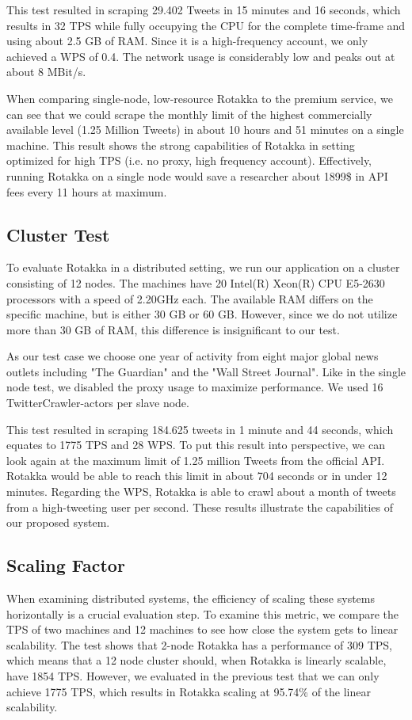 \documentclass{sigchi}
\begin{document}
This test resulted in scraping 29.402 Tweets in 15 minutes and 16 seconds, which results in 32 TPS while fully occupying the CPU for the complete time-frame and using about 2.5 GB of RAM. Since it is a high-frequency account, we only achieved a WPS of 0.4. The network usage is considerably low and peaks out at about 8 MBit/s.

When comparing single-node, low-resource Rotakka to the premium service, we can see that we could scrape the monthly limit of the highest commercially available level (1.25 Million Tweets) in about 10 hours and 51 minutes on a single machine. This result shows the strong capabilities of Rotakka in setting optimized for high TPS (i.e. no proxy, high frequency account). Effectively, running Rotakka on a single node would save a researcher about 1899\$ in API fees every 11 hours at maximum.


\subsection{Cluster Test}
To evaluate Rotakka in a distributed setting, we run our application on a cluster consisting of 12 nodes. The machines have 20 Intel(R) Xeon(R) CPU E5-2630 processors with a speed of 2.20GHz each. The available RAM differs on the specific machine, but is either 30 GB or 60 GB. However, since we do not utilize more than 30 GB of RAM, this difference is insignificant to our test. 

As our test case we choose one year of activity from eight major global news outlets including "The Guardian" and the "Wall Street Journal". Like in the single node test, we disabled the proxy usage to maximize performance. We used 16 TwitterCrawler-actors per slave node.

This test resulted in scraping 184.625 tweets in 1 minute and 44 seconds, which equates to 1775 TPS and 28 WPS. To put this result into perspective, we can look again at the maximum limit of 1.25 million Tweets from the official API. Rotakka would be able to reach this limit in about 704 seconds or in under 12 minutes. Regarding the WPS, Rotakka is able to crawl about a month of tweets from a high-tweeting user per second. These results illustrate the capabilities of our proposed system.

\subsection{Scaling Factor}
When examining distributed systems, the efficiency of scaling these systems horizontally is a crucial evaluation step. To examine this metric, we compare the TPS of two machines and 12 machines to see how close the system gets to linear scalability. The test shows that 2-node Rotakka has a performance of 309 TPS, which means that a 12 node cluster should, when Rotakka is linearly scalable, have 1854 TPS. However, we evaluated in the previous test that we can only achieve 1775 TPS, which results in Rotakka scaling at 95.74\% of the linear scalability.
\end{document}
